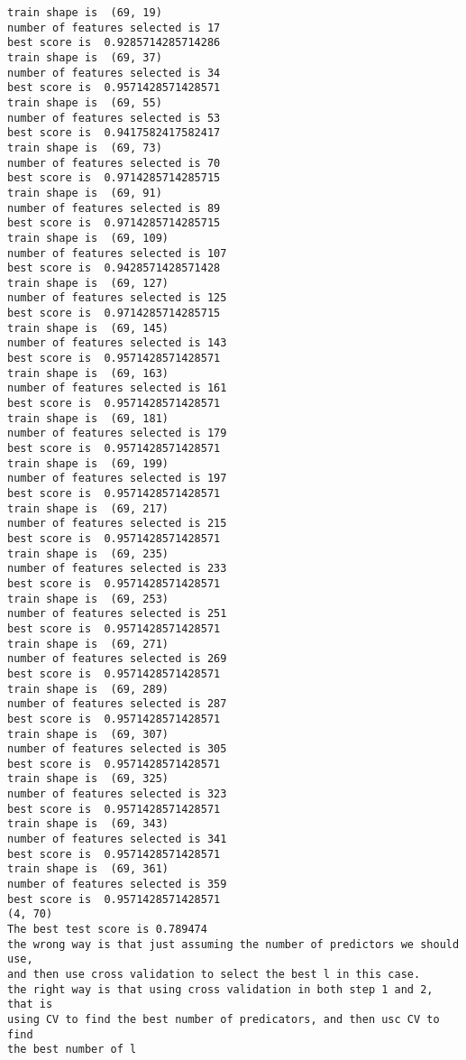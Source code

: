 \documentclass[11pt]{article}
\begin{document}
    \begin{Verbatim}[commandchars=\\\{\}]
train shape is  (69, 19)
number of features selected is 17
best score is  0.9285714285714286
train shape is  (69, 37)
number of features selected is 34
best score is  0.9571428571428571
train shape is  (69, 55)
number of features selected is 53
best score is  0.9417582417582417
train shape is  (69, 73)
number of features selected is 70
best score is  0.9714285714285715
train shape is  (69, 91)
number of features selected is 89
best score is  0.9714285714285715
train shape is  (69, 109)
number of features selected is 107
best score is  0.9428571428571428
train shape is  (69, 127)
number of features selected is 125
best score is  0.9714285714285715
train shape is  (69, 145)
number of features selected is 143
best score is  0.9571428571428571
train shape is  (69, 163)
number of features selected is 161
best score is  0.9571428571428571
train shape is  (69, 181)
number of features selected is 179
best score is  0.9571428571428571
train shape is  (69, 199)
number of features selected is 197
best score is  0.9571428571428571
train shape is  (69, 217)
number of features selected is 215
best score is  0.9571428571428571
train shape is  (69, 235)
number of features selected is 233
best score is  0.9571428571428571
train shape is  (69, 253)
number of features selected is 251
best score is  0.9571428571428571
train shape is  (69, 271)
number of features selected is 269
best score is  0.9571428571428571
train shape is  (69, 289)
number of features selected is 287
best score is  0.9571428571428571
train shape is  (69, 307)
number of features selected is 305
best score is  0.9571428571428571
train shape is  (69, 325)
number of features selected is 323
best score is  0.9571428571428571
train shape is  (69, 343)
number of features selected is 341
best score is  0.9571428571428571
train shape is  (69, 361)
number of features selected is 359
best score is  0.9571428571428571
(4, 70)
The best test score is 0.789474
the wrong way is that just assuming the number of predictors we should use, 
and then use cross validation to select the best l in this case.
the right way is that using cross validation in both step 1 and 2, that is 
using CV to find the best number of predicators, and then usc CV to find 
the best number of l

    \end{Verbatim}
\end{document}
